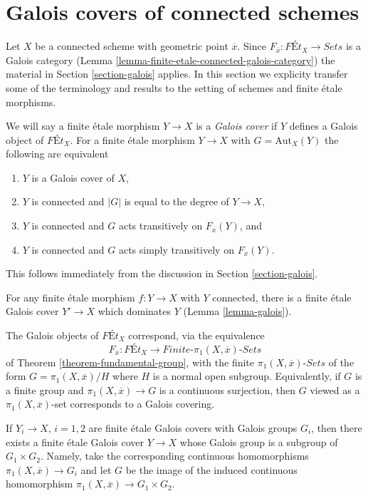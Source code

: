 \section{Galois covers of connected schemes}
\label{section-finite-etale-under-galois}

\noindent
Let $X$ be a connected scheme with geometric point $\overline{x}$.
Since $F_{\overline{x}} : \textit{F\'Et}_X \to \textit{Sets}$ is a
Galois category (Lemma \ref{lemma-finite-etale-connected-galois-category})
the material in Section \ref{section-galois} applies.
In this section we explicity transfer some of the terminology
and results to the setting of schemes and finite \'etale morphisms.

\medskip\noindent
We will say a finite \'etale morphism $Y \to X$ is a
{\it Galois cover} if $Y$ defines a Galois object of
$\textit{F\'Et}_X$.
For a finite \'etale morphism $Y \to X$ with $G = \text{Aut}_X(Y)$
the following are equivalent
\begin{enumerate}
\item $Y$ is a Galois cover of $X$,
\item $Y$ is connected and $|G|$ is equal to the degree of $Y \to X$,
\item $Y$ is connected and $G$ acts transitively on $F_{\overline{x}}(Y)$, and
\item $Y$ is connected and $G$ acts simply transitively on
$F_{\overline{x}}(Y)$.
\end{enumerate}
This follows immediately from the discussion in Section \ref{section-galois}.

\medskip\noindent
For any finite \'etale morphism $f : Y \to X$ with $Y$ connected,
there is a finite \'etale Galois cover $Y' \to X$ which dominates $Y$
(Lemma \ref{lemma-galois}).

\medskip\noindent
The Galois objects of $\textit{F\'Et}_X$ correspond, via the equivalence
$$
F_{\overline{x}} : \textit{F\'Et}_X \to
\textit{Finite-}\pi_1(X, \overline{x})\textit{-Sets}
$$
of Theorem \ref{theorem-fundamental-group},
with the finite $\pi_1(X, \overline{x})\textit{-Sets}$
of the form $G = \pi_1(X, \overline{x})/H$ where $H$ is a
normal open subgroup. Equivalently, if $G$ is a finite group
and $\pi_1(X, \overline{x}) \to G$ is a continuous surjection,
then $G$ viewed as a $\pi_1(X, \overline{x})$-set corresponds
to a Galois covering.

\medskip\noindent
If $Y_i \to X$, $i = 1, 2$ are finite \'etale Galois covers
with Galois groups $G_i$, then there exists a finite \'etale
Galois cover $Y \to X$ whose Galois group is a subgroup of
$G_1 \times G_2$. Namely, take the corresponding continuous
homomorphisms $\pi_1(X, \overline{x}) \to G_i$ and
let $G$ be the image of the induced continuous homomorphism
$\pi_1(X, \overline{x}) \to G_1 \times G_2$.









